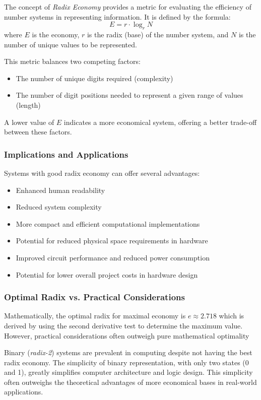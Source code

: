\documentclass[12pt]{report}
\begin{document}
The concept of \textit{Radix Economy} provides a metric for evaluating the efficiency of number systems in representing information. It is defined by the formula:
\[ E = r \cdot \log_r N \]
where $E$ is the economy, $r$ is the radix (base) of the number system, and $N$ is the number of unique values to be represented. \

This metric balances two competing factors:
\begin{itemize}
	\item The number of unique digits required (complexity)
	\item The number of digit positions needed to represent a given range of values (length)
\end{itemize}

A lower value of $E$ indicates a more economical system, offering a better trade-off between these factors.

\subsubsection*{Implications and Applications}
Systems with good radix economy can offer several advantages:
\begin{itemize}
	\item Enhanced human readability
	\item Reduced system complexity
	\item More compact and efficient computational implementations
	\item Potential for reduced physical space requirements in hardware
	\item Improved circuit performance and reduced power consumption
	\item Potential for lower overall project costs in hardware design
\end{itemize}
\subsubsection*{Optimal Radix vs. Practical Considerations}

Mathematically, the optimal radix for maximal economy is $e \approx 2.718$ which is derived by using the second derivative test to determine the maximum value. However, practical considerations often outweigh pure mathematical optimality

Binary (\textit{radix-2}) systems are prevalent in computing despite not having the best radix economy. The simplicity of binary representation, with only two states (0 and 1), greatly simplifies computer architecture and logic design. This simplicity often outweighs the theoretical advantages of more economical bases in real-world applications.
\end{document}
